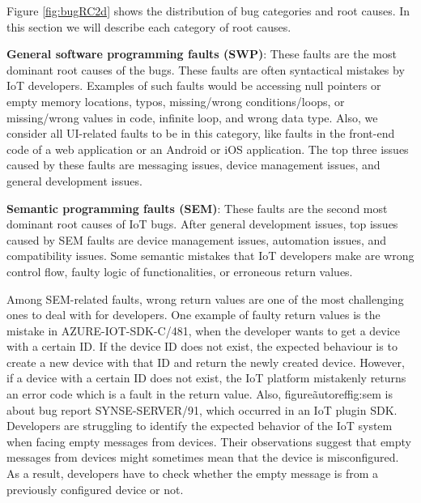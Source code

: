 Figure \ref{fig:bugRC2d} shows the distribution of bug categories and root causes. In this section we will describe each category of root causes. 

\textbf{General software programming faults (SWP)}: These faults are the most dominant root causes of the bugs. These faults are often syntactical mistakes by IoT developers. Examples of such faults would be accessing null pointers or empty memory locations, typos, missing/wrong conditions/loops, or missing/wrong values in code, infinite loop, and wrong data type. Also, we consider all UI-related faults to be in this category, like faults in the front-end code of a web application or an Android or iOS application. The top three issues caused by these faults are messaging issues, device management issues, and general development issues.


\textbf{Semantic programming faults (SEM)}: These faults are the second most dominant root causes of IoT bugs. After general development issues, top issues caused by SEM faults are device management issues, automation issues, and compatibility issues. Some semantic mistakes that IoT developers make are wrong control flow, faulty logic of functionalities, or erroneous return values. 

Among SEM-related faults, wrong return values are one of the most challenging ones to deal with for developers. One example of faulty return values is the mistake in AZURE-IOT-SDK-C/481, when the developer wants to get a device with a certain ID. If the device ID does not exist, the expected behaviour is to create a new device with that ID and return the newly created device. However, if a device with a certain ID does not exist, the IoT platform mistakenly returns an error code which is a fault in the return value. Also, figure\~autoref{fig:sem} is about bug report SYNSE-SERVER/91, which occurred in an IoT plugin SDK. Developers are struggling to identify the expected behavior of the IoT system when facing empty messages from devices. Their observations suggest that empty messages from devices might sometimes mean that the device is misconfigured. As a result, developers have to check whether the empty message is from a previously configured device or not.

